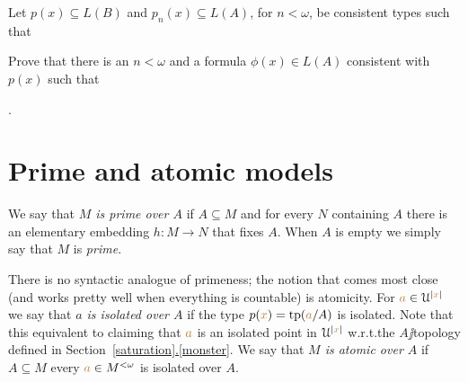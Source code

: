 \documentclass[creche.tex]{subfiles}
\begin{document}
\begin{exercise}
Let $p(x)\subseteq L(B)$ and $p_n(x)\subseteq L(A)$, for $n<\omega$, be consistent types such that\smallskip


\noindent Prove that there is an $n<\omega$ and a formula $\phi(x)\in L(A)$ consistent with $p(x)$ such that \smallskip

.\QED
\end{exercise}


\section{Prime and atomic models}

We say that \emph{$M$ is prime over $A$\/} if $A\subseteq M$ and for every $N$ containing $A$ there is an elementary embedding $h:M\to N$ that fixes $A$. When $A$ is empty we simply say that $M$ is \emph{prime}. 

There is no syntactic analogue of primeness; the notion that comes most close (and works pretty well when everything is countable) is atomicity. For ${\color{brown} a}\in\EuScript U^{|{\color{brown} x}|}$ we say that \emph{$a$ is isolated over $A$\/} if the type $p({\color{brown} x})={\rm tp}({\color{brown} a}/A)$ is isolated. Note that this equivalent to claiming that ${\color{brown} a}$ is an isolated point in $\EuScript U^{|{\color{brown} x}|}$ w.r.t.\@ the $A\jj$topology defined in Section~\hyperref[saturation]{\ref*{saturation}.\ref*{monster}}. We say that \emph{$M$ is atomic over $A$\/} if $A\subseteq M$ every ${\color{brown} a}\in M^{<\omega}$ is isolated over $A$.

\end{document}
